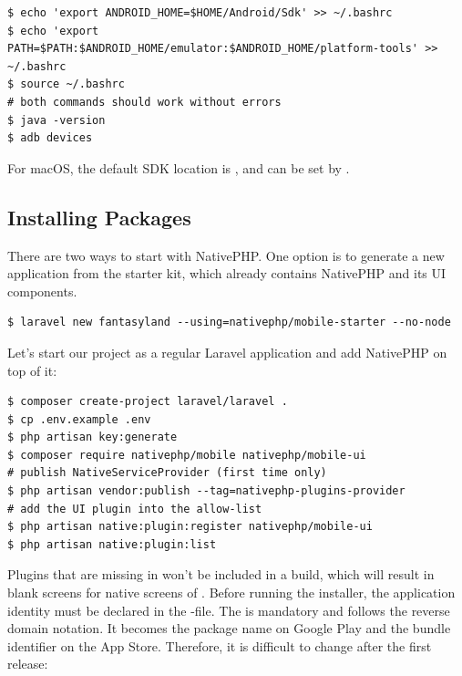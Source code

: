 \begin{lstlisting}[language=terminal]
$ echo 'export ANDROID_HOME=$HOME/Android/Sdk' >> ~/.bashrc
$ echo 'export PATH=$PATH:$ANDROID_HOME/emulator:$ANDROID_HOME/platform-tools' >> ~/.bashrc
$ source ~/.bashrc
# both commands should work without errors
$ java -version
$ adb devices
\end{lstlisting}

\noindent For macOS, the default SDK location is , and
 can be set by .


\subsection{Installing Packages}

There are two ways to start with NativePHP. One option is to generate a new application from the
starter kit, which already contains NativePHP and its UI components.

\begin{lstlisting}[language=terminal]
$ laravel new fantasyland --using=nativephp/mobile-starter --no-node
\end{lstlisting}

\noindent Let's start our project as a regular Laravel application and add NativePHP on top of
it:

\begin{lstlisting}[language=terminal]
$ composer create-project laravel/laravel .
$ cp .env.example .env
$ php artisan key:generate
$ composer require nativephp/mobile nativephp/mobile-ui
# publish NativeServiceProvider (first time only)
$ php artisan vendor:publish --tag=nativephp-plugins-provider
# add the UI plugin into the allow-list
$ php artisan native:plugin:register nativephp/mobile-ui
$ php artisan native:plugin:list
\end{lstlisting}

\noindent Plugins that are missing in  won't be included in
a build, which will result in blank screens for native screens of .
Before running the installer, the application identity must be declared in the -file.
The  is mandatory and follows the reverse domain notation. It becomes the
package name on Google Play and the bundle identifier on the App Store. Therefore, it is
difficult to change after the first release:

